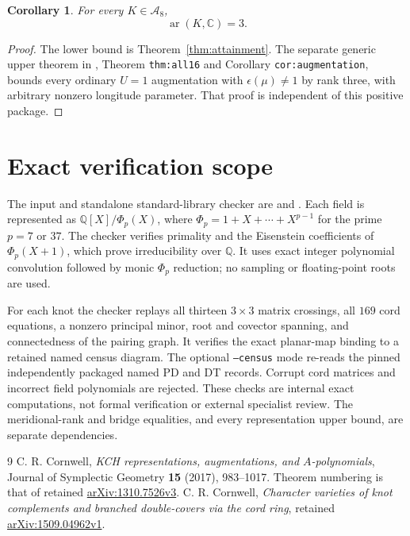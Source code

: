 \documentclass[11pt]{article}
\newtheorem{corollary}[theorem]{Corollary}
\newcommand{\ar}{\operatorname{ar}}
\begin{document}
\begin{corollary}\label{cor:augmentation}
For every $K\in\mathcal A_8$,
\[
                         \ar(K,\mathbb C)=3.
\]
\end{corollary}
\begin{proof}
The lower bound is Theorem~\ref{thm:attainment}. The separate generic
upper theorem in , Theorem
\texttt{thm:all16} and Corollary \texttt{cor:augmentation}, bounds every
ordinary $U=1$ augmentation with $\epsilon(\mu)\ne1$ by rank three,
with arbitrary nonzero longitude parameter. That proof is independent
of this positive package.
\end{proof}

\section{Exact verification scope}

The input and standalone standard-library checker are
 and
. Each field is represented
as $\mathbb Q[X]/\Phi_p(X)$, where
$\Phi_p=1+X+\cdots+X^{p-1}$ for the prime $p=7$ or $37$.
The checker verifies primality and the Eisenstein coefficients of
$\Phi_p(X+1)$, which prove irreducibility over $\mathbb Q$.
It uses exact integer polynomial convolution followed by monic
$\Phi_p$ reduction; no sampling or floating-point roots are used.

For each knot the checker replays all thirteen $3\times3$ matrix
crossings, all $169$ cord equations, a nonzero principal minor,
root and covector spanning, and connectedness of the pairing graph.
It verifies the exact planar-map binding to a retained named census
diagram. The optional \texttt{--census} mode re-reads the pinned
independently packaged named PD and DT records. Corrupt cord matrices
and incorrect field polynomials are rejected. These checks are internal
exact computations, not formal verification or external specialist review.
The meridional-rank and bridge equalities, and every representation
upper bound, are separate dependencies.

\begin{thebibliography}{9}
C. R. Cornwell, \emph{KCH representations, augmentations, and
$A$-polynomials}, Journal of Symplectic Geometry \textbf{15} (2017), 983--1017.
Theorem numbering is that of retained
\href{https://arxiv.org/abs/1310.7526v3}{arXiv:1310.7526v3}.
C. R. Cornwell, \emph{Character varieties of knot complements and
branched double-covers via the cord ring}, retained
\href{https://arxiv.org/abs/1509.04962v1}{arXiv:1509.04962v1}.
\end{thebibliography}
\end{document}
